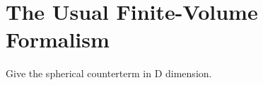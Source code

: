 \section{The Usual \Luscher Finite-Volume Formalism}\label{sec:counterterm/spherical}


Give the spherical counterterm in D dimension.
